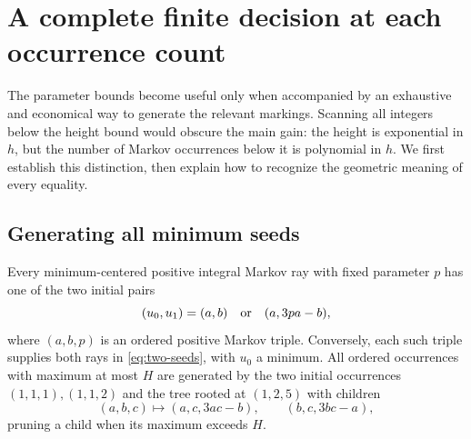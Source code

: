 \section{A complete finite decision at each occurrence count}
\label{sec:decision}

The parameter bounds become useful only when accompanied by an exhaustive
and economical way to generate the relevant markings. Scanning all integers
below the height bound would obscure the main gain: the height is
exponential in $h$, but the number of Markov occurrences below it is
polynomial in $h$. We first establish this distinction, then explain how
to recognize the geometric meaning of every equality.

\subsection{Generating all minimum seeds}

\begin{lemma}\label{lem:seed-completeness}
Every minimum-centered positive integral Markov ray with fixed parameter
$p$ has one of the two initial pairs
\begin{equation}\label{eq:two-seeds}
 (u_0,u_1)=(a,b)\quad\hbox{or}\quad(a,3pa-b),
\end{equation}
where $(a,b,p)$ is an ordered positive Markov triple. Conversely,
each such triple supplies both rays in \eqref{eq:two-seeds}, with
$u_0$ a minimum. All ordered occurrences with maximum at most $H$ are
generated by the two initial occurrences $(1,1,1),(1,1,2)$ and the tree
rooted at $(1,2,5)$ with children
\begin{equation}\label{eq:ordered-tree}
 (a,b,c)\longmapsto(a,c,3ac-b),\qquad(b,c,3bc-a),
\end{equation}
pruning a child when its maximum exceeds $H$.
\end{lemma}

